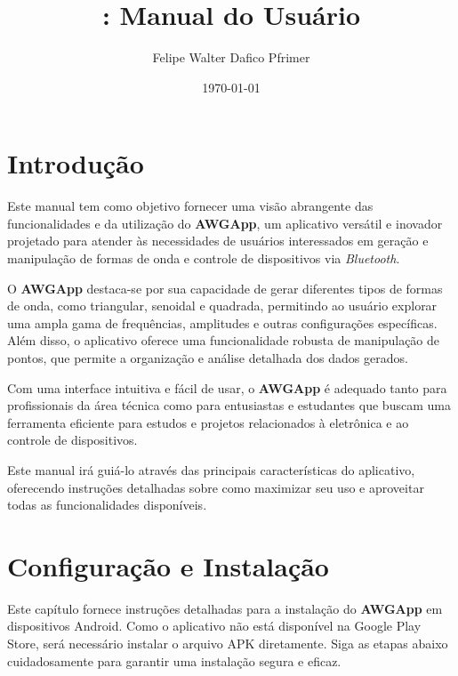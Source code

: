\documentclass[12pt,a4paper]{book}
\title{\nomesoftware: Manual do Usuário}
\author{Felipe Walter Dafico Pfrimer}
\date{\today}
\newcommand{\nomesoftware}{AWGApp}
\begin{document}
\maketitle

\tableofcontents

\doublespacing  %
\chapter*{Introdução}

Este manual tem como objetivo fornecer uma visão abrangente das funcionalidades e da utilização do \textbf{\nomesoftware}, um aplicativo versátil e inovador projetado para atender às necessidades de usuários interessados em geração e manipulação de formas de onda e controle de dispositivos via \textit{Bluetooth}.

O \textbf{\nomesoftware} destaca-se por sua capacidade de gerar diferentes tipos de formas de onda, como triangular, senoidal e quadrada, permitindo ao usuário explorar uma ampla gama de frequências, amplitudes e outras configurações específicas. Além disso, o aplicativo oferece uma funcionalidade robusta de manipulação de pontos, que permite a organização e análise detalhada dos dados gerados.

Com uma interface intuitiva e fácil de usar, o \textbf{\nomesoftware} é adequado tanto para profissionais da área técnica como para entusiastas e estudantes que buscam uma ferramenta eficiente para estudos e projetos relacionados à eletrônica e ao controle de dispositivos.

Este manual irá guiá-lo através das principais características do aplicativo, oferecendo instruções detalhadas sobre como maximizar seu uso e aproveitar todas as funcionalidades disponíveis.


\chapter{Configuração e Instalação}

Este capítulo fornece instruções detalhadas para a instalação do \textbf{\nomesoftware{}} em dispositivos Android. Como o aplicativo não está disponível na Google Play Store, será necessário instalar o arquivo APK diretamente. Siga as etapas abaixo cuidadosamente para garantir uma instalação segura e eficaz.
\end{document}
